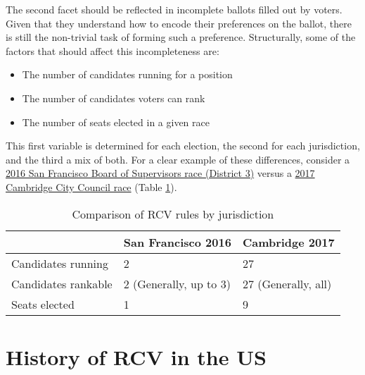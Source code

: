 \documentclass[12pt,twoside]{reedthesis}
\begin{document}
The second facet should be reflected in incomplete ballots filled out by voters. Given that they understand how to encode their preferences on the ballot, there is still the non-trivial task of forming such a preference. Structurally, some of the factors that should affect this incompleteness are:
\begin{itemize}
\item
  The number of candidates running for a position
\item
  The number of candidates voters can rank
\item
  The number of seats elected in a given race
\end{itemize}
This first variable is determined for each election, the second for each jurisdiction, and the third a mix of both. For a clear example of these differences, consider a \href{https://sfelections.org/results/20161108/data/20161206/d3/20161206_d3.pdf}{2016 San Francisco Board of Supervisors race (District 3)} versus a \href{https://www.cambridgema.gov/election2017/Council\%20Order\%20Round.htm}{2017 Cambridge City Council race} (Table \ref{tab:rcv-rules}).
\begin{table}[]
\centering
\caption{Comparison of RCV rules by jurisdiction}
\label{tab:rcv-rules}
\begin{tabular}{@{}l | ll@{}}
\toprule
\multicolumn{1}{l}{} & \multicolumn{1}{l}{San Francisco 2016} & \multicolumn{1}{l}{Cambridge 2017} \\ \midrule
\multicolumn{1}{l}{Candidates running} & \multicolumn{1}{l}{2} & \multicolumn{1}{l}{27} \\
\multicolumn{1}{l}{Candidates rankable} & \multicolumn{1}{l}{2 (Generally, up to 3)} & \multicolumn{1}{l}{27 (Generally, all)} \\
\multicolumn{1}{l}{Seats elected} & \multicolumn{1}{l}{1} & \multicolumn{1}{l}{9} \\ \bottomrule
\end{tabular}
\end{table}
\hypertarget{history-of-rcv-in-the-us}{%
\section{History of RCV in the US}\label{history-of-rcv-in-the-us}}
\end{document}
